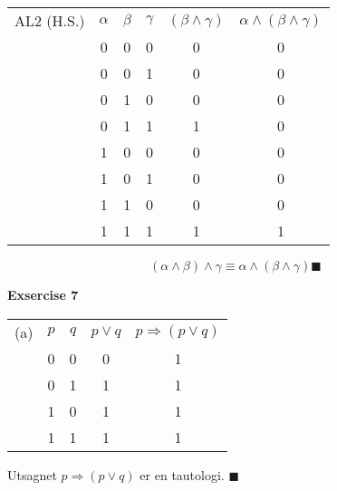 \documentclass[a4paper, 12pt]{article}  %
\begin{document}
\begin{table}[H]
    \begin{tabular}{c|c|c|c|c|c|}
        AL2 (H.S.) & $\alpha$ & $\beta$ & $\gamma$ & $(\beta \land \gamma)$ & $\alpha \land (\beta \land \gamma) $ \\
                   & 0        & 0       & 0        & 0                      & 0                                    \\
                   & 0        & 0       & 1        & 0                      & 0                                    \\
                   & 0        & 1       & 0        & 0                      & 0                                    \\
                   & 0        & 1       & 1        & 1                      & 0                                    \\
                   & 1        & 0       & 0        & 0                      & 0                                    \\
                   & 1        & 0       & 1        & 0                      & 0                                    \\
                   & 1        & 1       & 0        & 0                      & 0                                    \\
                   & 1        & 1       & 1        & 1                      & 1                                    \\
    \end{tabular}
    \begin{equation*}
        (\alpha \land \beta) \land \gamma \equiv \alpha \land (\beta \land \gamma) \blacksquare
    \end{equation*}
\end{table}


\textbf{Exsercise 7}

\begin{table}[H]
    \begin{tabular}{c|c|c|c|c|}
        (a) & $p$ & $q$ & $p \lor q$ & $p \Rightarrow (p \lor q)$ \\
            & 0   & 0   & 0          & 1                          \\
            & 0   & 1   & 1          & 1                          \\
            & 1   & 0   & 1          & 1                          \\
            & 1   & 1   & 1          & 1                          \\
    \end{tabular}
    \begin{center}
        Utsagnet $p \Rightarrow (p \lor q)$ er en tautologi. $\blacksquare$
    \end{center}
\end{table}
\end{document}

